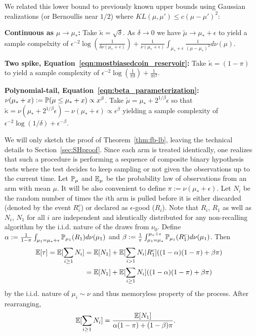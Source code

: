 \noindent We related this lower bound to previously known upper bounds using Gaussian realizations (or Bernoullis near $1/2$) where $KL(\mu,\mu') \leq c (\mu-\mu')^2$: 

\noindent\textbf{Continuous as $\mu \rightarrow \mu_*$:} Take $\widetilde{\kappa} = \sqrt{\delta}$. As $\delta \rightarrow 0$ we have $\widetilde{\mu} \rightarrow \mu_*+\epsilon$ to yield a sample compelxity of $\epsilon^{-2} \log(\tfrac{1}{ \delta \nu(\mu_*+\epsilon)}) + \frac{1}{\nu(\mu_*+\epsilon)} \int_{\mu_*+\epsilon} \frac{1}{(\mu-\mu_*)^2} d\nu(\mu)$.

\noindent\textbf{Two spike, Equation~\ref{eqn:mostbiasedcoin_reservoir}:} Take $\widetilde{\kappa} = (1-\pi)$ to yield a sample complexity of $\epsilon^{-2} \log(\tfrac{1}{\pi \delta}) + \frac{1}{\pi \epsilon^2}$.

\noindent\textbf{Polynomial-tail, Equation~\ref{eqn:beta_parameterization}:} $\nu(\mu_* + x) := \P( \mu \leq \mu_* + x) \propto x^\beta$. Take $\widetilde{\mu} = \mu_* + 2^{1/\beta} \epsilon$ so that $\widetilde{\kappa} = \nu(\mu_*+2^{1/\beta} \epsilon) - \nu(\mu_* + \epsilon) \propto \epsilon^\beta$ yielding a sample complexity of $\epsilon^{-2}\log(1/\delta) + \epsilon^{-\beta}$.

We will only sketch the proof of Theorem~\ref{thm:fb-lb}, leaving the technical details to Section~\ref{sec:SHproof}.
Since each arm is treated identically, one realizes that such a procedure is performing a sequence of composite binary hypothesis tests where the test decides to keep sampling or not given the observations up to the current time.
Let $\P_\mu$ and $\E_\mu$ be the probability law of observations from an arm with mean $\mu$.
It will be also convenient to define $\pi:=\nu(\mu_*+\epsilon)$.
Let $N_i$ be the random number of times the $i$th arm is pulled before it is either discarded (denoted by the event $R_i^c$) or declared as $\epsilon$-good ($R_i$). 
Note that $R_i$, $R_1$ as well as $N_i$, $N_1$ for all $i$ are independent and identically distributed for any non-recalling algorithm by the i.i.d. nature of the draws from $\nu_0$.
Define $\alpha := \frac{1}{1-\pi} \int_{\mu_1 = \mu_* + \epsilon} \P_{\mu_1}(R_1) d\nu(\mu_1)$ and $\beta := \frac{1}{\pi} \int_{\mu_1 = \mu_*}^{\mu_* + \epsilon} \P_{\mu_1}(R_1^c) d\nu(\mu_1)$.
Then
\begin{align*}
\E[\tau] = \E[ \sum_{i \geq 1} N_i ]
 &= \E[N_1] + \E[\sum_{i > 1} N_i | R_1^c] ( (1-\alpha) (1-\pi) + \beta \pi) \\
&= \E[N_1] + \E[\sum_{i \geq 1} N_i ] ( (1-\alpha) (1-\pi) + \beta \pi) 
\end{align*}
by the i.i.d. nature of $\mu_i \sim \nu$ and thus memoryless property of the process.
After rearranging,
\begin{align}
\E[ \sum_{i \geq 1} N_i ] &= \frac{\E[N_1]}{\alpha (1-\pi) + (1-\beta) \pi}. \label{eqn:N1_to_many}
\end{align}


